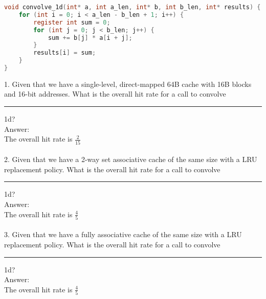 \documentclass{article}
\begin{document}
\lstset{
    basicstyle=\ttfamily,
    breaklines=true,
    frame=single,
}

\begin{lstlisting}[language=C]
void convolve_1d(int* a, int a_len, int* b, int b_len, int* results) {
    for (int i = 0; i < a_len - b_len + 1; i++) {
        register int sum = 0;
        for (int j = 0; j < b_len; j++) {
            sum += b[j] * a[i + j];
        }
        results[i] = sum;
    }
}
\end{lstlisting}
1. Given that we have a single-level, direct-mapped 64B cache with 16B blocks and 16-bit addresses. What is the overall hit rate for a call to convolve\rule{0.2cm}{0.4pt}1d?\\
Answer:\\
The overall hit rate is $\frac{2}{15}$
\\
\\
2. Given that we have a 2-way set associative cache of the same size with a LRU replacement policy. What is the overall hit rate for a call to convolve\rule{0.2cm}{0.4pt}1d?\\
Answer:\\
The overall hit rate is $\frac{4}{5}$
\\
\\
3. Given that we have a fully associative cache of the same size with a LRU replacement policy. What is the overall hit rate for a call to convolve\rule{0.2cm}{0.4pt}1d?\\
Answer:\\
The overall hit rate is $\frac{4}{5}$
\end{document}
